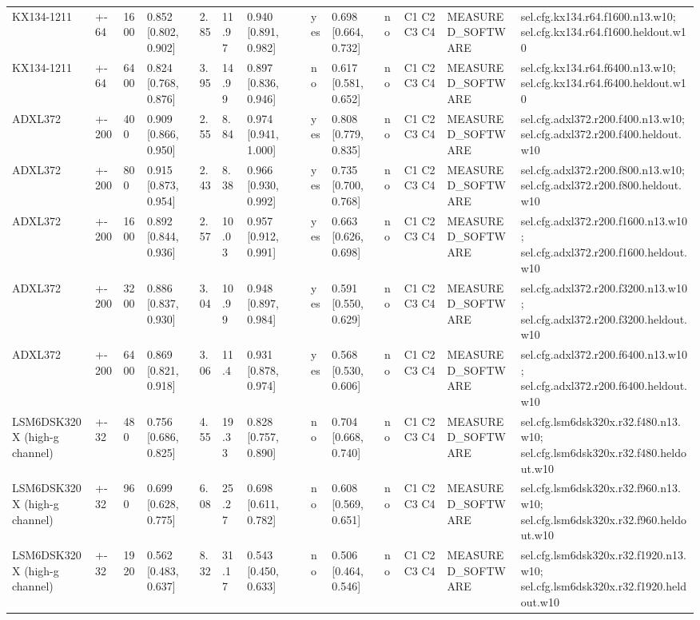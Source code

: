 \begin{table}[t]
\begin{tabular}{llllllllllllll}
KX134-1211 & +-64 & 1600 & 0.852 [0.802, 0.902] & 2.85 & 11.97 & 0.940 [0.891, 0.982] &  & yes & 0.698 [0.664, 0.732] & no & C1 C2 C3 C4 & MEASURED\_SOFTWARE & sel.cfg.kx134.r64.f1600.n13.w10; sel.cfg.kx134.r64.f1600.heldout.w10 \\
KX134-1211 & +-64 & 6400 & 0.824 [0.768, 0.876] & 3.95 & 14.99 & 0.897 [0.836, 0.946] &  & no & 0.617 [0.581, 0.652] & no & C1 C2 C3 C4 & MEASURED\_SOFTWARE & sel.cfg.kx134.r64.f6400.n13.w10; sel.cfg.kx134.r64.f6400.heldout.w10 \\
ADXL372 & +-200 & 400 & 0.909 [0.866, 0.950] & 2.55 & 8.84 & 0.974 [0.941, 1.000] &  & yes & 0.808 [0.779, 0.835] & no & C1 C2 C3 C4 & MEASURED\_SOFTWARE & sel.cfg.adxl372.r200.f400.n13.w10; sel.cfg.adxl372.r200.f400.heldout.w10 \\
ADXL372 & +-200 & 800 & 0.915 [0.873, 0.954] & 2.43 & 8.38 & 0.966 [0.930, 0.992] &  & yes & 0.735 [0.700, 0.768] & no & C1 C2 C3 C4 & MEASURED\_SOFTWARE & sel.cfg.adxl372.r200.f800.n13.w10; sel.cfg.adxl372.r200.f800.heldout.w10 \\
ADXL372 & +-200 & 1600 & 0.892 [0.844, 0.936] & 2.57 & 10.03 & 0.957 [0.912, 0.991] &  & yes & 0.663 [0.626, 0.698] & no & C1 C2 C3 C4 & MEASURED\_SOFTWARE & sel.cfg.adxl372.r200.f1600.n13.w10; sel.cfg.adxl372.r200.f1600.heldout.w10 \\
ADXL372 & +-200 & 3200 & 0.886 [0.837, 0.930] & 3.04 & 10.99 & 0.948 [0.897, 0.984] &  & yes & 0.591 [0.550, 0.629] & no & C1 C2 C3 C4 & MEASURED\_SOFTWARE & sel.cfg.adxl372.r200.f3200.n13.w10; sel.cfg.adxl372.r200.f3200.heldout.w10 \\
ADXL372 & +-200 & 6400 & 0.869 [0.821, 0.918] & 3.06 & 11.4 & 0.931 [0.878, 0.974] &  & yes & 0.568 [0.530, 0.606] & no & C1 C2 C3 C4 & MEASURED\_SOFTWARE & sel.cfg.adxl372.r200.f6400.n13.w10; sel.cfg.adxl372.r200.f6400.heldout.w10 \\
LSM6DSK320X (high-g channel) & +-32 & 480 & 0.756 [0.686, 0.825] & 4.55 & 19.33 & 0.828 [0.757, 0.890] &  & no & 0.704 [0.668, 0.740] & no & C1 C2 C3 C4 & MEASURED\_SOFTWARE & sel.cfg.lsm6dsk320x.r32.f480.n13.w10; sel.cfg.lsm6dsk320x.r32.f480.heldout.w10 \\
LSM6DSK320X (high-g channel) & +-32 & 960 & 0.699 [0.628, 0.775] & 6.08 & 25.27 & 0.698 [0.611, 0.782] &  & no & 0.608 [0.569, 0.651] & no & C1 C2 C3 C4 & MEASURED\_SOFTWARE & sel.cfg.lsm6dsk320x.r32.f960.n13.w10; sel.cfg.lsm6dsk320x.r32.f960.heldout.w10 \\
LSM6DSK320X (high-g channel) & +-32 & 1920 & 0.562 [0.483, 0.637] & 8.32 & 31.17 & 0.543 [0.450, 0.633] &  & no & 0.506 [0.464, 0.546] & no & C1 C2 C3 C4 & MEASURED\_SOFTWARE & sel.cfg.lsm6dsk320x.r32.f1920.n13.w10; sel.cfg.lsm6dsk320x.r32.f1920.heldout.w10 \\

\end{tabular}
\end{table}
